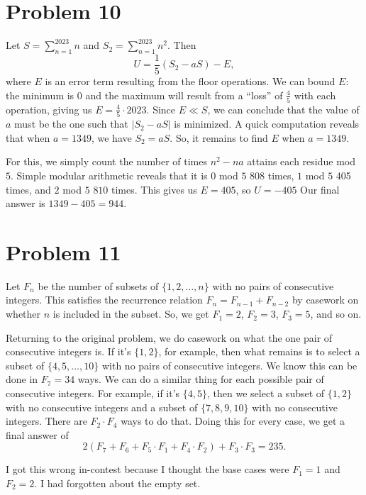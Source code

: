 \documentclass{scrartcl}
\begin{document}
\section*{Problem 10}
Let $S = \sum_{n=1}^{2023} n$ and $S_2 = \sum_{n=1}^{2023} n^2$.
Then
\[ U = \frac15 (S_2 - aS) - E, \]
where $E$ is an error term resulting from the floor operations.
We can bound $E$: the minimum is $0$ and the maximum will result from
a ``loss'' of $\frac45$ with each operation, giving us $E = \frac45 \cdot 2023$.
Since $E \ll S$, we can conclude that the value of $a$ must be the one such that $|S_2 - aS|$ is
minimized.
A quick computation reveals that when $a = 1349$, we have $S_2 = aS$.
So, it remains to find $E$ when $a = 1349$.

For this, we simply count the number of times $n^2 - na$ attains each residue mod $5$.
Simple modular arithmetic reveals that it is $0$ mod $5$ $808$ times,
$1$ mod $5$ 405 times, and $2$ mod $5$ $810$ times.
This gives us $E = 405$, so $U = -405$
Our final answer is $1349 - 405 = \boxed{944}$.

\section*{Problem 11}
Let $F_n$ be the number of subsets of $\{1,2,\dots, n\}$ with no pairs of consecutive integers.
This satisfies the recurrence relation $F_n = F_{n-1} + F_{n-2}$ by casework on whether $n$ is
included in the subset.
So, we get $F_1 = 2$, $F_2 = 3$, $F_3 = 5$, and so on.

Returning to the original problem, we do casework on what the one pair of consecutive integers is.
If it's $\{1,2\}$, for example, then what remains is to select a subset of
$\{4,5,\dots, 10\}$ with no pairs of consecutive integers.
We know this can be done in $F_7 = 34$ ways.
We can do a similar thing for each possible pair of consecutive integers.
For example, if it's $\{4,5\}$,
then we select a subset of $\{1,2\}$ with no consecutive integers
and a subset of $\{7,8,9,10\}$ with no consecutive integers.
There are $F_2 \cdot F_4$ ways to do that.
Doing this for every case, we get a final answer of
\[ 2(F_7 + F_6 + F_5 \cdot F_1 + F_4 \cdot F_2) + F_3 \cdot F_3 = \boxed{235}. \]

\begin{remark*}
I got this wrong in-contest because I thought the base cases were $F_1 = 1$ and $F_2 = 2$.
I had forgotten about the empty set.
\end{remark*}
\end{document}
